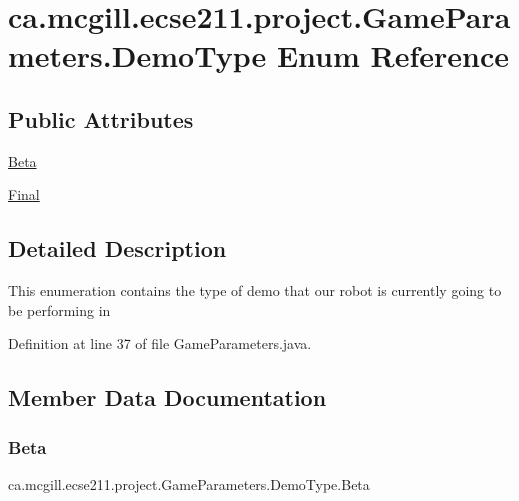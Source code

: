 \hypertarget{enumca_1_1mcgill_1_1ecse211_1_1project_1_1_game_parameters_1_1_demo_type}{}\section{ca.\+mcgill.\+ecse211.\+project.\+Game\+Parameters.\+Demo\+Type Enum Reference}
\label{enumca_1_1mcgill_1_1ecse211_1_1project_1_1_game_parameters_1_1_demo_type}
\subsection*{Public Attributes}
\begin{DoxyCompactItemize}
\item 
\hyperlink{enumca_1_1mcgill_1_1ecse211_1_1project_1_1_game_parameters_1_1_demo_type_a8d4e576df991cb52b50ae54b2812aa7f}{Beta}
\item 
\hyperlink{enumca_1_1mcgill_1_1ecse211_1_1project_1_1_game_parameters_1_1_demo_type_a1ba3e060bfd5f76af77b713321abc7f6}{Final}
\end{DoxyCompactItemize}


\subsection{Detailed Description}
This enumeration contains the type of demo that our robot is currently going to be performing in 

Definition at line 37 of file Game\+Parameters.\+java.



\subsection{Member Data Documentation}
\mbox{\label{enumca_1_1mcgill_1_1ecse211_1_1project_1_1_game_parameters_1_1_demo_type_a8d4e576df991cb52b50ae54b2812aa7f}} 
\subsubsection{\texorpdfstring{Beta}{Beta}}
{\footnotesize\ttfamily ca.\+mcgill.\+ecse211.\+project.\+Game\+Parameters.\+Demo\+Type.\+Beta}



